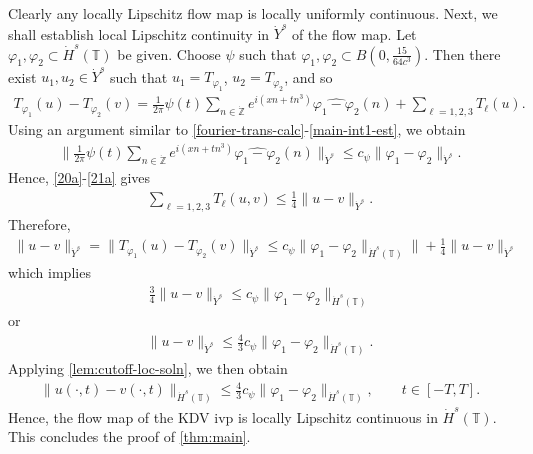 \documentclass[12pt,reqno]{amsart}
\numberwithin{equation}{section}  %
\numberwithin{figure}{section}
\newcommand{\zz}{\mathbb{Z}}
\newcommand{\ci}{\mathbb{T}}
\newcommand{\zzdot}{\dot{\zz}}
\newcommand{\wh}{\widehat}
\newcommand{\vp}{\varphi}
\theoremstyle{plain}
\theoremstyle{definition}
\theoremstyle{remark}
\begin{document}
%
%
Clearly any locally Lipschitz flow map is locally uniformly continuous. 
Next, we shall establish local Lipschitz continuity in $\dot{Y}^s$ of the flow
map. Let $\vp_1, \vp_2 \subset \dot{H}^s(\ci)$ be given. Choose $\psi$ such that
$\vp_1, \vp_2 \subset B(0, \frac{15}{64c^{3}})$.  Then there exist $u_1, u_2 \in
\dot{Y}^s$ such that $u_1 = T_{\vp_1}$, $u_2 = T_{\vp_2}$, and so
%
%
\begin{equation*}
	\begin{split}
		T_{\vp_1}(u) - T_{\vp_2}(v) = \frac{1}{2\pi} \psi(t) \sum_{n \in
		\zzdot}e^{i\left( xn + tn^{3} \right)} \wh{\vp_1 - \vp_2}(n) + \sum_{\ell
		= 1,2,3} T_{\ell}(u).
	\end{split}
\end{equation*}
%
%
Using an argument similar to \eqref{fourier-trans-calc}-\eqref{main-int1-est},
we obtain
%
%
\begin{equation*}
	\begin{split}
		\| \frac{1}{2\pi} \psi(t) \sum_{n \in
		\zzdot}e^{i\left( xn + tn^{3} \right)} \wh{\vp_1 - \vp_2}(n)\|_{\dot{Y}^s}
		\le c_\psi \|\vp_{1} - \vp_{2}\|_{\dot{Y}^s}.
	\end{split}
\end{equation*}
%
%
Hence, \eqref{20a}-\eqref{21a} gives
%
%
\begin{equation*}
	\begin{split}
		\sum_{\ell=1,2,3} T_{\ell}(u,v) \le \frac{1}{4}\|u-v\|_{\dot{Y}^s}.
	\end{split}
\end{equation*}
%
%
Therefore,
%
%
\begin{equation*}
	\begin{split}
		\|u -v \|_{\dot{Y}^s} = \|T_{\vp_1}(u) - T_{\vp_2}(v) \|_{\dot{Y}^s} \le c_\psi
		\|\vp_{1} - \vp_{2} \|_{\dot{H}^s\left( \ci \right)}\| +
		\frac{1}{4} \|u -v \|_{\dot{Y}^s}
	\end{split}
\end{equation*}
%
%
which implies
%
%
\begin{equation*}
	\begin{split}
		\frac{3}{4} \|u-v\|_{\dot{Y}^s} \le c_\psi \|\vp_1 - \vp_2 \|_{\dot{H}^s(\ci)}
	\end{split}
\end{equation*}
%
%
or
%
%
\begin{equation*}
	\begin{split}
		\|u -v \|_{\dot{Y}^s} \le \frac{4}{3} c_\psi \|\vp_1 - \vp_2 \|_{\dot{H}^s(\ci)}.
	\end{split}
\end{equation*}
%
%
Applying \autoref{lem:cutoff-loc-soln}, we then obtain
%
%
	 \begin{equation*}
		 \begin{split}
			\|u(\cdot, t) -v(\cdot, t) \|_{\dot{H}^s(\ci)} \le \frac{4}{3} c_\psi \|\vp_1 -
			\vp_2 \|_{\dot{H}^s(\ci)}, \qquad t \in [-T, T].
		 \end{split}
	 \end{equation*}
Hence, the flow map of the KDV ivp is locally Lipschitz continuous in
$\dot{H}^s(\ci)$. This
concludes the proof of \autoref{thm:main}. \qquad \qedsymbol
%
%
%
%
\end{document}
